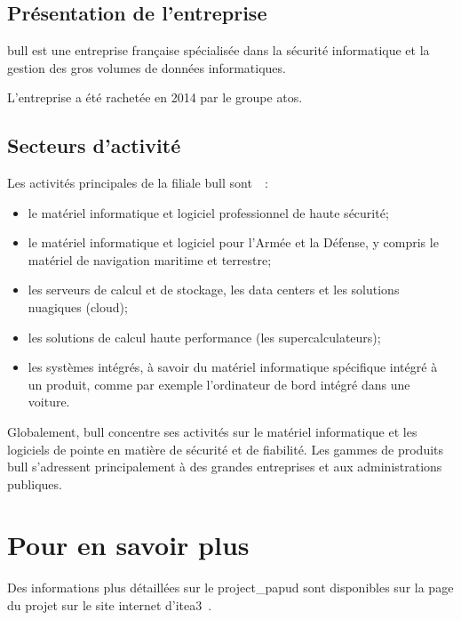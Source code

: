 \section{}
\subsection{Présentation de l'entreprise}
\gls{bull} est une entreprise française spécialisée dans la sécurité informatique et la gestion des gros volumes de données informatiques. 

L'entreprise a été rachetée en 2014 par le groupe \gls{atos}.

\pagebreak
\subsection{Secteurs d'activité} \label{def:cloud} \label{def:data centers}
Les activités principales de la filiale \gls{bull} sont~\autocite{bull_produits}~:
\begin{itemize}
	\item le matériel informatique et logiciel professionnel de haute sécurité;
	\item le matériel informatique et logiciel pour l'Armée et la Défense, y compris le matériel de navigation maritime et terrestre;
	\item les serveurs de calcul et de stockage, les \gls{data centers} et les solutions nuagiques (\gls{cloud});
	\item les solutions de calcul haute performance (les \og supercalculateurs\fg{});
	\item les systèmes intégrés, à savoir du matériel informatique spécifique intégré à un produit, comme par exemple l'ordinateur de bord intégré dans une voiture.
\end{itemize}
\vspace{1em}

Globalement, \gls{bull} concentre ses activités sur le matériel informatique et les logiciels de pointe en matière de sécurité et de fiabilité.
Les gammes de produits \gls{bull} s'adressent principalement à des grandes entreprises et aux administrations publiques.

\section*{Pour en savoir plus}
Des informations plus détaillées sur le \gls{project_papud} sont disponibles sur la page du projet sur le site internet d'\gls{itea3}~\autocite{about_papud}.